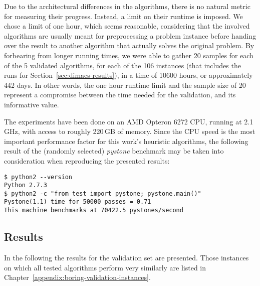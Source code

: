 \documentclass[thesis.tex]{subfiles}
\begin{document}
Due to the architectural differences in the algorithms, there is no natural metric for measuring their progress. Instead, a limit on their runtime is imposed. We chose a limit of one hour, which seems reasonable, considering that the involved algorithms are usually meant for preprocessing a problem instance before handing over the result to another algorithm that actually solves the original problem. By forbearing from longer running times, we were able to gather 20 samples for each of the 5 validated algorithms, for each of the 106 instances (that includes the runs for Section~\ref{sec:dimacs-results}), in a time of 10600 hours, or approximately 442 days. In other words, the one hour runtime limit and the sample size of 20 represent a compromise between the time needed for the validation, and its informative value.

\clearpage
The experiments have been done on an AMD Opteron 6272 CPU, running at 2.1\,GHz, with access to roughly 220\,GB of memory. Since the CPU speed is the most important performance factor for this work's heuristic algorithms, the following result of the (randomly selected) \emph{pystone} benchmark may be taken into consideration when reproducing the presented results:
\begin{center}
\begin{verbatim}
$ python2 --version
Python 2.7.3
$ python2 -c "from test import pystone; pystone.main()"
Pystone(1.1) time for 50000 passes = 0.71
This machine benchmarks at 70422.5 pystones/second
\end{verbatim}
\end{center}


\subsection{Results}
   \label{sec:validation-performance}
%
\newcommand{\CurrentInstanceOrig}{}
\newcommand{\CurrentInstance}{}
\newcommand{\CurrentInstanceFileEscaped}{}
\newcommand{\CurrentInstanceTexEscaped}{}

In the following the results for the validation set are presented. Those instances on which all tested algorithms perform very similarly are listed in Chapter~\vref{appendix:boring-validation-instances}.
\end{document}
